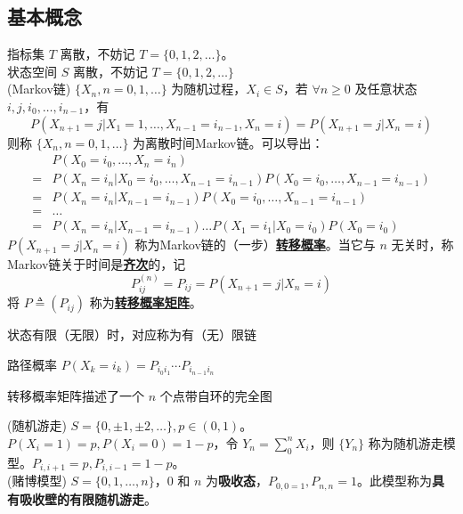 \documentclass[./main.tex]{subfiles}
\begin{document}
\subsection{基本概念}
指标集 $T$ 离散，不妨记 $T=\{0,1,2,\dots\}$。\\
\indent 状态空间 $S$ 离散，不妨记 $T=\{0,1,2,\dots\}$\\
(Markov链) $\{X_n,n=0,1,\dots\}$ 为随机过程，$X_i\in S$，若 $\forall n\ge 0$ 及任意状态 $i,j,i_0,\dots,i_{n-1}$，有
\begin{equation}P(X_{n+1}=j|X_1=1,\dots,X_{n-1}=i_{n-1},X_n=i)=P(X_{n+1}=j|X_n=i)\end{equation}
则称 $\{X_n,n=0,1,\dots\}$ 为离散时间Markov链。可以导出：
\begin{align*}
    &P(X_0=i_0,\dots,X_n=i_n)\\
    =&P(X_n=i_n|X_0=i_0,\dots,X_{n-1}=i_{n-1})P(X_0=i_0,\dots,X_{n-1}=i_{n-1})\\
    =&P(X_n=i_n|X_{n-1}=i_{n-1})P(X_0=i_0,\dots,X_{n-1}=i_{n-1})\\
    =&\dots\\
    =&P(X_n=i_n|X_{n-1}=i_{n-1})\dots P(X_1=i_1|X_0=i_0)P(X_0=i_0)
\end{align*}
$P(X_{n+1}=j|X_n=i)$ 称为Markov链的（一步）\underline{\textbf{转移概率}}。当它与 $n$ 无关时，称Markov链关于时间是\textbf{\underline{齐次}}的，记
\begin{equation}P_{ij}^{(n)}=P_{ij}=P(X_{n+1}=j|X_n=i)\end{equation}
将 $P\triangleq(P_{ij})$ 称为\underline{\textbf{转移概率矩阵}}。
\begin{enumerate*}
    \item 状态有限（无限）时，对应称为有（无）限链
    \item 路径概率 $P(X_k=i_k)=P_{i_0i_1}\cdots P_{i_{n-1}i_n}$
    \item 转移概率矩阵描述了一个 $n$ 个点带自环的完全图
\end{enumerate*}
(随机游走) $S=\{0,\pm 1,\pm 2,\dots\},p\in (0,1)$。$P(X_i=1)=p,P(X_i=0)=1-p$，令 $Y_n=\sum_0^nX_i$，则 $\{Y_n\}$ 称为随机游走模型。$P_{i,i+1}=p,P_{i,i-1}=1-p$。\\
(赌博模型) $S=\{0,1,\dots,n\}$，0 和 $n$ 为\textbf{吸收态}，$P_{0,0=1},P_{n,n}=1$。此模型称为\textbf{具有吸收壁的有限随机游走}。
\end{document}
